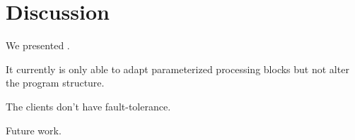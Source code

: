 \section{Discussion}
\label{sec:discussion}

We presented \sysname{}.

It currently is only able to adapt parameterized processing blocks but not alter
the program structure.

The clients don't have fault-tolerance.


Future work.

